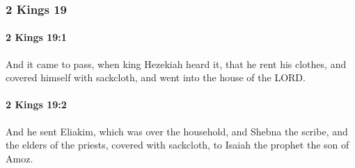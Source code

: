 	\subsubsection{2 Kings 19} %
		\label{2KINGS-19}

		\paragraph{2 Kings 19:1} %
			\label{2KINGS-19-1}

			And it came to pass, when king Hezekiah heard it, that he rent his clothes, and covered himself with sackcloth, and went into the house of the LORD.


		\paragraph{2 Kings 19:2} %
			\label{2KINGS-19-2}

			And he sent Eliakim, which was over the household, and Shebna the scribe, and the elders of the priests, covered with sackcloth, to Isaiah the prophet the son of Amoz.

